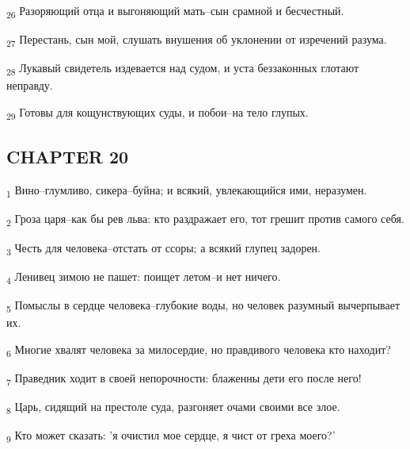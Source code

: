 \begin{tcolorbox}
\textsubscript{26} Разоряющий отца и выгоняющий мать--сын срамной и бесчестный.
\end{tcolorbox}
\begin{tcolorbox}
\textsubscript{27} Перестань, сын мой, слушать внушения об уклонении от изречений разума.
\end{tcolorbox}
\begin{tcolorbox}
\textsubscript{28} Лукавый свидетель издевается над судом, и уста беззаконных глотают неправду.
\end{tcolorbox}
\begin{tcolorbox}
\textsubscript{29} Готовы для кощунствующих суды, и побои--на тело глупых.
\end{tcolorbox}
\subsection{CHAPTER 20}
\begin{tcolorbox}
\textsubscript{1} Вино--глумливо, сикера--буйна; и всякий, увлекающийся ими, неразумен.
\end{tcolorbox}
\begin{tcolorbox}
\textsubscript{2} Гроза царя--как бы рев льва: кто раздражает его, тот грешит против самого себя.
\end{tcolorbox}
\begin{tcolorbox}
\textsubscript{3} Честь для человека--отстать от ссоры; а всякий глупец задорен.
\end{tcolorbox}
\begin{tcolorbox}
\textsubscript{4} Ленивец зимою не пашет: поищет летом--и нет ничего.
\end{tcolorbox}
\begin{tcolorbox}
\textsubscript{5} Помыслы в сердце человека--глубокие воды, но человек разумный вычерпывает их.
\end{tcolorbox}
\begin{tcolorbox}
\textsubscript{6} Многие хвалят человека за милосердие, но правдивого человека кто находит?
\end{tcolorbox}
\begin{tcolorbox}
\textsubscript{7} Праведник ходит в своей непорочности: блаженны дети его после него!
\end{tcolorbox}
\begin{tcolorbox}
\textsubscript{8} Царь, сидящий на престоле суда, разгоняет очами своими все злое.
\end{tcolorbox}
\begin{tcolorbox}
\textsubscript{9} Кто может сказать: 'я очистил мое сердце, я чист от греха моего?'
\end{tcolorbox}
